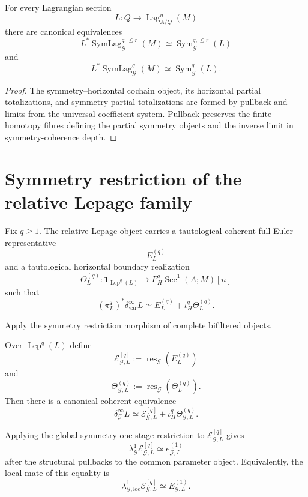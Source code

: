 \begin{theorem}
\label{thm:symmetry-noether-individual-symmetry-objects-are-pullbacks}
For every Lagrangian section
\[
L:Q\longrightarrow\operatorname{Lag}_{A/Q}^n(M)
\]
there are canonical equivalences
\[
L^*
\operatorname{SymLag}_{\mathcal G}^{q,\le r}(M)
\simeq
\operatorname{Sym}_{\mathcal G}^{q,\le r}(L)
\]
and
\[
L^*
\operatorname{SymLag}_{\mathcal G}^{q}(M)
\simeq
\operatorname{Sym}_{\mathcal G}^{q}(L).
\]
\end{theorem}

\begin{proof}
The symmetry--horizontal cochain object, its horizontal partial totalizations, and
symmetry partial totalizations are formed by pullback and limits from the universal
coefficient system.  Pullback preserves the finite homotopy fibres defining the
partial symmetry objects and the inverse limit in symmetry-coherence depth.
\end{proof}

\section{Symmetry restriction of the relative Lepage family}
\label{sec:symmetry-noether-symmetry-restriction-of-the-relative-lepage-family}

Fix $q\ge1$.  The relative Lepage object carries a tautological coherent full Euler
representative
\[
E_L^{(q)}
\]
and a tautological horizontal boundary realization
\[
\Theta_L^{(q)}
:
\mathbf 1_{\operatorname{Lep}^q(L)}
\longrightarrow
F_H^q\operatorname{Sec}^1(A;M)[n]
\]
such that
\[
(\pi_L^q)^*\delta_{\mathrm{var}}^\infty L
\simeq
E_L^{(q)}
+
\iota_H^q\Theta_L^{(q)}.
\]

Apply the symmetry restriction morphism of complete bifiltered objects.

\begin{construction}
\label{constr:symmetry-noether-symmetry-restricted-lepage-factorization}
Over $\operatorname{Lep}^q(L)$ define
\[
\mathscr E_{\mathcal G,L}^{[q]}
:=
\operatorname{res}_{\mathcal G}(E_L^{(q)})
\]
and
\[
\Theta_{\mathcal G,L}^{(q)}
:=
\operatorname{res}_{\mathcal G}(\Theta_L^{(q)}).
\]
Then there is a canonical coherent equivalence
\[
\boxed{
\delta_{\mathcal G}^{\infty}L
\simeq
\mathscr E_{\mathcal G,L}^{[q]}
+
\iota_H^q
\Theta_{\mathcal G,L}^{(q)}.
}
\]
\end{construction}

\begin{proposition}
\label{prop:symmetry-noether-one-stage-image-of-the-symmetry-euler-representative}
Applying the global symmetry one-stage restriction to
$\mathscr E_{\mathcal G,L}^{[q]}$ gives
\[
\lambda_{\mathcal G}^{1}
\mathscr E_{\mathcal G,L}^{[q]}
\simeq
e_{\mathcal G,L}^{(1)}
\]
after the structural pullbacks to the common parameter object.  Equivalently,
the local mate of this equality is
\[
\lambda_{\mathcal G,\mathrm{loc}}^{1}
\mathscr E_{\mathcal G,L}^{[q]}
\simeq
E_{\mathcal G,L}^{(1)}.
\]
\end{proposition}

